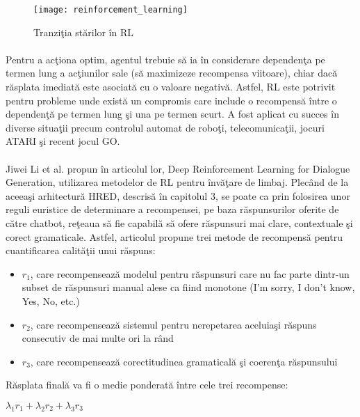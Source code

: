 \begin{figure}[H]
\centering
\texttt{[image: reinforcement\_learning]}
\caption{Tranzi\c tia st\u arilor \^ in RL}
\end{figure}

\paragraph{}
Pentru a ac\c tiona optim, agentul trebuie s\u a ia \^ in considerare dependen\c ta pe termen lung a ac\c tiunilor sale (s\u a maximizeze recompensa viitoare), chiar dac\u a r\u asplata imediat\u a este asociat\u a cu o valoare negativ\u a. Astfel, RL este potrivit pentru probleme unde exist\u a un compromis care include o recompens\u a \^ intre o dependen\c t\u a pe termen lung \c si una pe termen scurt. A fost aplicat cu succes \^ in diverse situa\c tii precum controlul automat de robo\c ti, telecomunica\c tii, jocuri ATARI \c si recent jocul GO.

\paragraph{}
Jiwei Li et al. propun \^ in articolul lor, Deep Reinforcement Learning for Dialogue Generation, utilizarea metodelor de RL pentru \^ inv\u a\c tare de limbaj. Plec\^ and de la aceea\c si arhitectur\u a HRED, descris\u a \^ in capitolul 3, se poate ca prin folosirea unor reguli euristice de determinare a recompensei, pe baza r\u aspunsurilor oferite de c\u atre chatbot, re\c teaua s\u a fie capabil\u a s\u a ofere r\u aspunsuri mai clare, contextuale \c si corect gramaticale. Astfel, articolul propune trei metode de recompens\u a pentru cuantificarea calit\u a\c tii unui r\u aspuns:

\begin{itemize}
	\item \(r_1\), care recompenseaz\u a modelul pentru r\u aspunsuri care nu fac parte dintr-un subset de r\u aspunsuri manual alese ca fiind monotone (I'm sorry, I don't know, Yes, No, etc.)
	\item \(r_2\), care recompenseaz\u a sistemul pentru nerepetarea aceluia\c si r\u aspuns consecutiv de mai multe ori la r\^ and
	\item \(r_3\), care recompenseaz\u a corectitudinea gramatical\u a \c si coeren\c ta r\u aspunsului
\end{itemize}


R\u asplata final\u a va fi o medie ponderat\u a \^ intre cele trei recompense:
\begin{center}
\(\lambda_1 r_1 + \lambda_2 r_2 + \lambda_3 r_3\)
\end{center}

